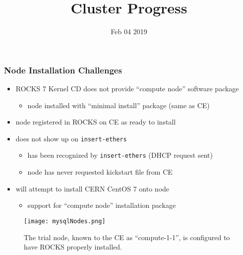 \documentclass{beamer}
\title{Cluster Progress}
\date{Feb 04 2019}
\begin{document}

\begin{frame}
\titlepage
\end{frame}



\begin{frame}

  \frametitle{Node Installation Challenges}

  \begin{itemize}
    \item ROCKS 7 Kernel CD does not provide ``compute node'' software package
    \begin{itemize}
      \item node installed with ``minimal install'' package (same as CE)
    \end{itemize}
    \item node registered in ROCKS on CE as ready to install
    \item does not show up on {\tt insert-ethers}
      \begin{itemize}
        \item has been recognized by {\tt insert-ethers} (DHCP request sent)
        \item node has never requested kickstart file from CE
      \end{itemize}
    \item will attempt to install CERN CentOS 7 onto node
      \begin{itemize}
        \item support for ``compute node'' installation package
      \end{itemize}
  \end{itemize}

  \begin{figure}[H]
    \begin{center}
      \texttt{[image: mysqlNodes.png]}
    \end{center}
    \caption{The trial node, known to the CE as ``compute-1-1'', is configured to
      have ROCKS properly installed.}
  \end{figure}

\end{frame}

\end{document}
